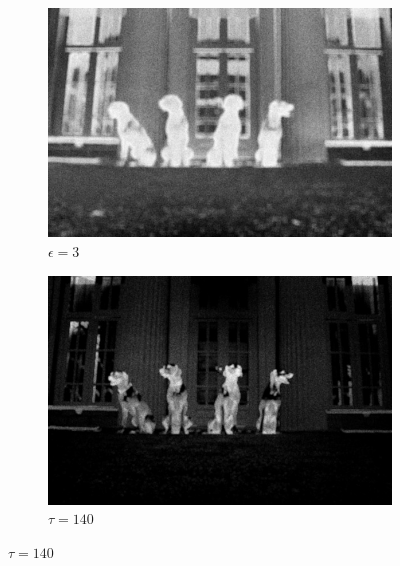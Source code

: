 \begin{figure}[H]
    \begin{subfigure}{0.4\textwidth}
      \centering
      \includegraphics[scale=1.0]{obrazky/StentifordSM-3neigh.jpg}
      \caption{$\epsilon=3$}
    \end{subfigure}
    \begin{subfigure}{0.4\textwidth}
      \centering
      \includegraphics[scale=1.0]{obrazky/StentifordSM-treshold140.jpg}
      \caption{$\tau=140$}
    \end{subfigure}
    \vspace{1pt}
    

\end{figure}
